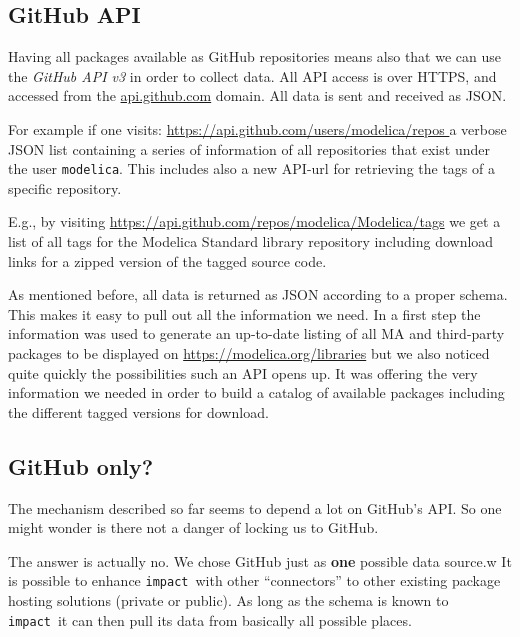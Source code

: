 \documentclass[11pt,a4paper,twocolumn]{article}
\newcommand{\impact}{\texttt{impact}} %
\newcommand{\code}[1]{\texttt{#1}} %
\begin{document}

\subsection{GitHub API}
\label{sec:gh-api}
Having all packages available as GitHub repositories means also that we can use
the \emph{GitHub API v3}\cite{gh-api} in order to collect data.
All API access is over HTTPS, and accessed from the \url{api.github.com} domain.
All data is sent and received as JSON\cite{json}.

For example if one visits:
\url{https://api.github.com/users/modelica/repos }
a verbose JSON list containing a series of information of all repositories
that exist under the user \code{modelica}.
This includes also a new API-url for retrieving the tags of a specific
repository.

E.g., by visiting \url{https://api.github.com/repos/modelica/Modelica/tags}
we get a list of all tags for the Modelica Standard library repository including
download links for a zipped version of the tagged source code.

As mentioned before, all data is returned as JSON according to a proper schema.
This makes it easy to pull out all the information we need.
In a first step the information was used to generate an up-to-date listing of
all MA and third-party packages to be displayed on
\url{https://modelica.org/libraries} but we also noticed quite quickly the
possibilities such an API opens up.
It was offering the very information we needed in order to build a catalog of
available packages including the different tagged versions for download.

\subsection{GitHub only?}
\label{sec:gh-only}
The mechanism described so far seems to depend a lot on GitHub's API.
So one might wonder is there not a danger of locking us to GitHub.

The answer is actually no. We chose GitHub just as \textbf{one} possible
data source.w
It is possible to enhance \impact\ with other ``connectors'' to other existing
package hosting solutions (private or public).
As long as the schema is known to \impact\ it can then  pull its data
from basically all possible places.
\end{document}
